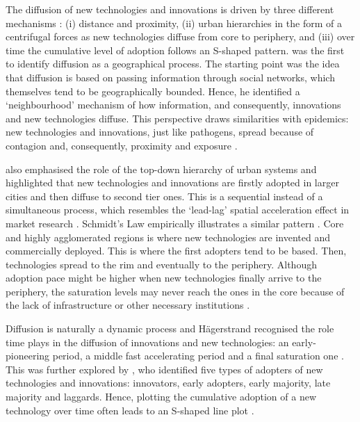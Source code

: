 \documentclass[
  authoryear,
  preprint,
  3p]{elsarticle}
\begin{document}
The diffusion of new technologies and innovations is driven by three
different mechanisms \citep{grubler1990rise, morrill2020spatial}: (i)
distance and proximity, (ii) urban hierarchies in the form of a
centrifugal forces as new technologies diffuse from core to periphery,
and (iii) over time the cumulative level of adoption follows an S-shaped
pattern. \citet{hagerstrand1968innovation} was the first to identify
diffusion as a geographical process. The starting point was the idea
that diffusion is based on passing information through social networks,
which themselves tend to be geographically bounded. Hence, he identified
a `neighbourhood' mechanism of how information, and consequently,
innovations and new technologies diffuse. This perspective draws
similarities with epidemics: new technologies and innovations, just like
pathogens, spread because of contagion and, consequently, proximity and
exposure \citep{hivner2003facilitating}.

\citet{hagerstrand1968innovation} also emphasised the role of the
top-down hierarchy of urban systems and highlighted that new
technologies and innovations are firstly adopted in larger cities and
then diffuse to second tier ones. This is a sequential instead of a
simultaneous process, which resembles the `lead-lag' spatial
acceleration effect in market research
\citep{bento2018time, PERES201091}. Schmidt's Law empirically
illustrates a similar pattern \citep{grubler1990rise}. Core and highly
agglomerated regions is where new technologies are invented and
commercially deployed. This is where the first adopters tend to be
based. Then, technologies spread to the rim and eventually to the
periphery. Although adoption pace might be higher when new technologies
finally arrive to the periphery, the saturation levels may never reach
the ones in the core because of the lack of infrastructure or other
necessary institutions \citep{leibowicz2016representing}.

Diffusion is naturally a dynamic process and Hägerstrand recognised the
role time plays in the diffusion of innovations and new technologies: an
early-pioneering period, a middle fast accelerating period and a final
saturation one \citep{morrill2020spatial}. This was further explored by
\citet{rogers2010diffusion}, who identified five types of adopters of
new technologies and innovations: innovators, early adopters, early
majority, late majority and laggards. Hence, plotting the cumulative
adoption of a new technology over time often leads to an S-shaped line
plot \citep{grubler1990rise}.
\end{document}
